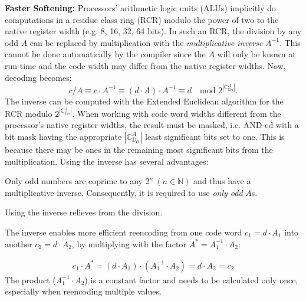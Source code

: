\textbf{Faster Softening:}
Processors' arithmetic logic units (ALUs) implicitly do computations in a residue class ring (RCR) modulo the power of two to the native register width (e.g. 8, 16, 32, 64 bits). In such an RCR, the division by any odd \(A\) can be replaced by multiplication with the \emph{multiplicative inverse} \(A^{-1}\). This cannot be done automatically by the compiler since the \(A\) will only be known at run-time and the code width may differ from the native register widths. Now, decoding becomes:
\begin{equation}
c / A \equiv c \cdot A^{-1} \equiv (d \cdot A) \cdot A^{-1} \equiv d \quad \text{mod }2^{|\mathbb{C}_{\mathbb{D}_\Theta}^A|}.
\label{eq:newdecode}
\end{equation}
The inverse can be computed with the Extended Euclidean algorithm for the RCR modulo \(2^{|\mathbb{C}_{\mathbb{D}_\Theta}^A|}\). When working with code word widths different from the processor's native register widths, the result must be masked, i.e. AND-ed with a bit mask having the appropriate \(|\mathbb{C}_{\mathbb{D}_\Theta}^A|\) least significant bits set to one. This is because there may be ones in the remaining most significant bits from the multiplication. Using the inverse has several advantages:
\begin{compactenum}
	\item Only odd numbers are coprime to any \(2^n~(n\in\mathbb{N})\) and thus have a multiplicative inverse. Consequently, it is required to use \emph{only odd} \(A\)s.
	\item Using the inverse relieves  from the division.
	\item The inverse enables more efficient reencoding from one code word \(c_1 = d \cdot A_1\) into another \(c_2 = d \cdot A_2\), by multiplying with the factor \(A^* = A_1^{-1} \cdot A_2\):
\end{compactenum}
\begin{gather}
c_1 \cdot A^* = (d \cdot A_1) \cdot (A_1^{-1} \cdot A_2) = d \cdot A_2 = c_2
\label{eq:newreencode}
\end{gather}
The product (\(A_1^{-1} \cdot A_2\)) is a constant factor and needs to be calculated only once, especially when reencoding multiple values.


